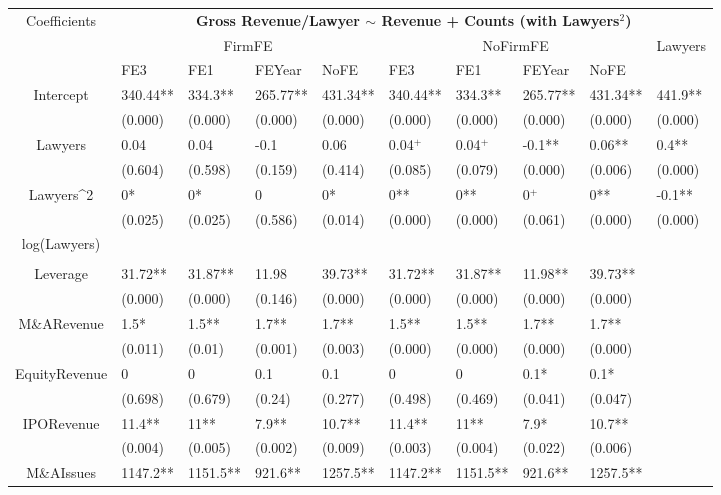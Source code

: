 \documentclass{article}
\begin{document}
\begin{table}[H]
\centering
\begin{tabular}{|clllllllll|}
\hline
\multirow{3}{*}{Coefficients} & \multicolumn{9}{c|}{\textbf{Gross Revenue/Lawyer $\sim$ Revenue + Counts (with Lawyers$^2$)}} \\
\cline{2-10}
& \multicolumn{4}{c}{FirmFE} & \multicolumn{4}{c}{NoFirmFE} & \multirow{2}{*}{Lawyers} \\
\cline{2-9}
& FE3 & FE1 & FEYear & NoFE & FE3 & FE1 & FEYear & NoFE &  \\
\hline
 
Intercept & 340.44** & 334.3** & 265.77** & 431.34** & 340.44** & 334.3** & 265.77** & 431.34** & 441.9** \\ 
   & (0.000) & (0.000) & (0.000) & (0.000) & (0.000) & (0.000) & (0.000) & (0.000) & (0.000) \\ 
  Lawyers & 0.04 & 0.04 & -0.1 & 0.06 & 0.04$^{+}$ & 0.04$^{+}$ & -0.1** & 0.06** & 0.4** \\ 
   & (0.604) & (0.598) & (0.159) & (0.414) & (0.085) & (0.079) & (0.000) & (0.006) & (0.000) \\ 
  Lawyers^2 & 0* & 0* & 0 & 0* & 0** & 0** & 0$^{+}$ & 0** & -0.1** \\ 
   & (0.025) & (0.025) & (0.586) & (0.014) & (0.000) & (0.000) & (0.061) & (0.000) & (0.000) \\ 
  log(Lawyers) &  &  &  &  &  &  &  &  &  \\ 
   &  &  &  &  &  &  &  &  &  \\ 
  Leverage & 31.72** & 31.87** & 11.98 & 39.73** & 31.72** & 31.87** & 11.98** & 39.73** &  \\ 
   & (0.000) & (0.000) & (0.146) & (0.000) & (0.000) & (0.000) & (0.000) & (0.000) &  \\ 
  M\&ARevenue & 1.5* & 1.5** & 1.7** & 1.7** & 1.5** & 1.5** & 1.7** & 1.7** &  \\ 
   & (0.011) & (0.01) & (0.001) & (0.003) & (0.000) & (0.000) & (0.000) & (0.000) &  \\ 
  EquityRevenue & 0 & 0 & 0.1 & 0.1 & 0 & 0 & 0.1* & 0.1* &  \\ 
   & (0.698) & (0.679) & (0.24) & (0.277) & (0.498) & (0.469) & (0.041) & (0.047) &  \\ 
  IPORevenue & 11.4** & 11** & 7.9** & 10.7** & 11.4** & 11** & 7.9* & 10.7** &  \\ 
   & (0.004) & (0.005) & (0.002) & (0.009) & (0.003) & (0.004) & (0.022) & (0.006) &  \\ 
  M\&AIssues & 1147.2** & 1151.5** & 921.6** & 1257.5** & 1147.2** & 1151.5** & 921.6** & 1257.5** &  \\ 

\end{tabular}
\end{table}
\end{document}
